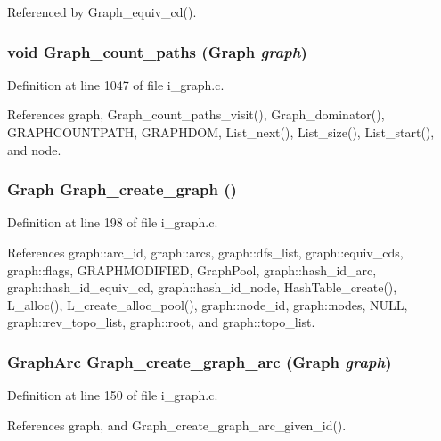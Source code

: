 Referenced by Graph\_\-equiv\_\-cd().
\subsubsection{\setlength{\rightskip}{0pt plus 5cm}void Graph\_\-count\_\-paths (\bf{Graph} {\em graph})}\label{i__graph_8h_e1d55ff27eba3393de356891cc9f8561}




Definition at line 1047 of file i\_\-graph.c.

References graph, Graph\_\-count\_\-paths\_\-visit(), Graph\_\-dominator(), GRAPHCOUNTPATH, GRAPHDOM, List\_\-next(), List\_\-size(), List\_\-start(), and node.
\subsubsection{\setlength{\rightskip}{0pt plus 5cm}\bf{Graph} Graph\_\-create\_\-graph ()}\label{i__graph_8h_a846a24de5258a3c8f2b6e4f343a4fe4}




Definition at line 198 of file i\_\-graph.c.

References graph::arc\_\-id, graph::arcs, graph::dfs\_\-list, graph::equiv\_\-cds, graph::flags, GRAPHMODIFIED, Graph\-Pool, graph::hash\_\-id\_\-arc, graph::hash\_\-id\_\-equiv\_\-cd, graph::hash\_\-id\_\-node, Hash\-Table\_\-create(), L\_\-alloc(), L\_\-create\_\-alloc\_\-pool(), graph::node\_\-id, graph::nodes, NULL, graph::rev\_\-topo\_\-list, graph::root, and graph::topo\_\-list.
\subsubsection{\setlength{\rightskip}{0pt plus 5cm}\bf{Graph\-Arc} Graph\_\-create\_\-graph\_\-arc (\bf{Graph} {\em graph})}\label{i__graph_8h_5f89323adca2a48c1f98f54cdfd2ac3c}




Definition at line 150 of file i\_\-graph.c.

References graph, and Graph\_\-create\_\-graph\_\-arc\_\-given\_\-id().


